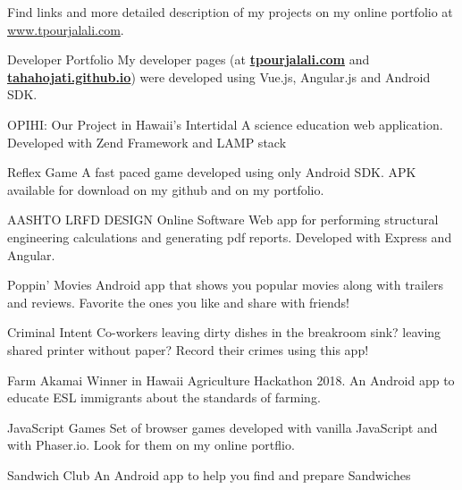 
	Find links and more detailed description of my projects on my online portfolio at \mbox{\href{http://www.tpourjalali.com}{www.tpourjalali.com}}.
\begin{cventries}
	
	\cventry
	{\faLaptop\faAndroid\enspace Developer Portfolio}
	{}
	{}
	{}
	{My developer pages (at \textbf{\href{http://www.tpourjalali.com}{tpourjalali.com}} and \textbf{\href{https://tahahojati.github.io}{ tahahojati.github.io}}) were developed using Vue.js, Angular.js and Android SDK.}

	\cventry
	{\faLaptop \enspace OPIHI: Our Project in Hawaii's Intertidal}
	{}
	{}
	{}
	{A science education web application. Developed with Zend Framework and LAMP stack}
	
	\cventry
	{\faAndroid\enspace Reflex Game}
	{}
	{}
	{}
	{A fast paced game developed using only Android SDK. APK available for download on my github and on my portfolio.}

	\cventry
	{\faLaptop\enspace AASHTO LRFD DESIGN Online Software}
	{}
	{}
	{}
	{Web app for performing structural engineering calculations and generating pdf reports. Developed with Express and Angular. }
	
	
	\cventry
	{\faAndroid\enspace Poppin' Movies}
	{}
	{}
	{}
	{Android app that shows you popular movies along with trailers and reviews.  Favorite the ones you like and share with friends! }
	
	\cventry
	{\faAndroid\enspace Criminal Intent}
	{}
	{}
	{}
	{Co-workers leaving dirty dishes in the breakroom sink? leaving shared printer without paper? Record their crimes using this app!}

	
	
	\cventry
	{\faTrophy\faAndroid\enspace Farm Akamai}
	{}
	{}
	{}
	{Winner in Hawaii Agriculture Hackathon 2018. An Android app to educate ESL immigrants about the standards of farming.}

	\cventry
	{\faChrome\enspace JavaScript Games}
	{}
	{}
	{}
	{Set of browser games developed with vanilla JavaScript and with Phaser.io. Look for them on my online portflio.}
	
	\cventry
	{\faAndroid\enspace Sandwich Club}
	{}
	{}
	{}
	{An Android app to help you find and prepare Sandwiches}
			

\end{cventries}
